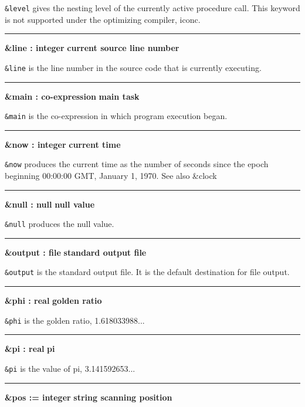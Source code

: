 \noindent
{}\texttt{\&level} gives the nesting level of the
currently active procedure call. This keyword is not supported under
the optimizing compiler, iconc.

\bigskip\hrule\vspace{0.1cm}
\noindent
{\bf \&line : integer } \hfill {\bf current source line number}

\noindent
{}\texttt{\&line} is the line number in the
source code that is currently executing.

\bigskip\hrule\vspace{0.1cm}
\noindent
{\bf \&main : co{}-expression } \hfill {\bf main task}

\noindent
{}\texttt{\&main} is the co-expression in which program
execution began.

\bigskip\hrule\vspace{0.1cm}
\noindent
{\bf \&now : integer } \hfill {\bf current time}

\noindent
{}\texttt{\&now} produces the current time as the
number of seconds since the epoch beginning 00:00:00 GMT, January 1,
1970. See also \&clock

\bigskip\hrule\vspace{0.1cm}
\noindent
{\bf \&null : null } \hfill {\bf null value}

\noindent
{}\texttt{\&null} produces the null value.

\bigskip\hrule\vspace{0.1cm}
\noindent
{\bf \&output : file } \hfill {\bf standard output file}

\noindent
{}\texttt{\&output} is the standard
output file. It is the default destination for file output.

\bigskip\hrule\vspace{0.1cm}
\noindent
{\bf \&phi : real } \hfill {\bf golden ratio}

\noindent
{}\texttt{\&phi}
is the golden ratio, 1.618033988...

\bigskip\hrule\vspace{0.1cm}
\noindent
{\bf \&pi : real } \hfill {\bf pi}

\noindent
{}\texttt{\&pi} is the value of pi, 3.141592653...

\bigskip\hrule\vspace{0.1cm}
\noindent
{\bf \&pos := integer } \hfill {\bf string scanning position}

